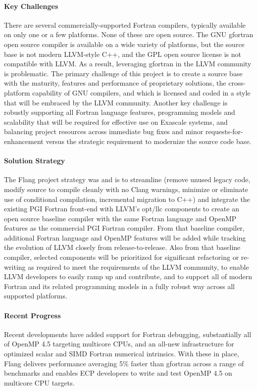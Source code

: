 \paragraph{Key Challenges}
There are several commercially-supported Fortran compilers, typically available on
only one or a few platforms.  None of these are open source.  The GNU gfortran
open source compiler is available on a wide variety of platforms, but the source
base is not modern LLVM-style C++, and the GPL open source license is not compatible
with LLVM. As a result, leveraging gfortran in the LLVM community is problematic.
The primary challenge of this project is to create a source base with the maturity,
features and performance of proprietary solutions, the cross-platform capability
of GNU compilers, and which is licensed and coded in a style that will be embraced
by the LLVM community.  Another key challenge is robustly supporting all Fortran
language features, programming models and scalability that will be required for
effective use on Exascale systems, and balancing project resources across immediate
bug fixes and minor requests-for-enhancement versus the strategic requirement to
modernize the source code base.

\paragraph{Solution Strategy}
The Flang project strategy was and is to streamline (remove unused legacy code,
modify source to compile cleanly with no Clang warnings, minimize or eliminate use
of conditional compilation, incremental migration to C++) and integrate the
existing PGI Fortran front-end with LLVM's opt/llc components to create an open
source baseline compiler with the same Fortran language and OpenMP features as
the commercial PGI Fortran compiler.  From that baseline compiler, additional
Fortran language and OpenMP features will be added while tracking the evolution
of LLVM closely from release-to-release.  Also from that baseline compiler, selected
components will be prioritized for significant refactoring or re-writing as required
to meet the requirements of the LLVM community, to enable LLVM developers to
easily ramp up and contribute, and to support all of modern Fortran and its
related programming models in a fully robust way across all supported platforms.

\paragraph{Recent Progress}
Recent developments have added support for Fortran debugging, substantially all
of OpenMP 4.5 \cite{openmp-spec-45} targeting multicore CPUs, and an all-new infrastructure for optimized
scalar and SIMD Fortran numerical intrinsics. With these in place, Flang delivers
performance averaging 5\% faster than gfortran across a range of benchmarks and
enables ECP developers to write and test OpenMP 4.5 on multicore CPU targets.

